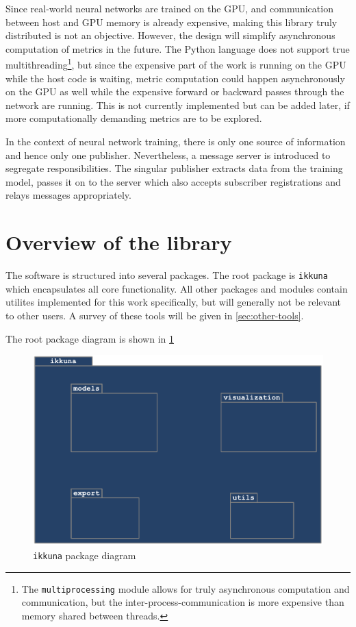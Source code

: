 Since real-world neural networks are trained on the GPU, and
communication between host and GPU memory is already expensive, making this
library truly distributed is not an objective. However, the design will
simplify asynchronous computation of metrics in the future. The Python
language does not support true multithreading\footnote{The
    \texttt{multiprocessing} module allows for truly
    asynchronous computation and communication, but the
    inter-process-communication is more expensive than memory shared
between threads.}, but since the expensive part of the work is running
on the GPU while the host code is waiting, metric computation could
happen asynchronously on the GPU as well while the expensive forward or
backward passes through the network are running. This is not currently
implemented but can be added later, if more computationally demanding
metrics are to be explored.

In the context of neural network training, there is only one source of
information and hence only one publisher. Nevertheless, a message server is
introduced to segregate responsibilities. The singular publisher extracts data from the
training model, passes it on to the server which also accepts subscriber
registrations and relays messages appropriately.

\hypertarget{overview-of-the-library}{%
\section{Overview of the library}\label{overview-of-the-library}}

The software is structured into several packages. The root package is
\texttt{ikkuna} which encapsulates all core
functionality. All other packages and modules contain utilites
implemented for this work specifically, but will generally not be
relevant to other users. A survey of these tools will be given in
\cref{sec:other-tools}.

The root package diagram is shown in \cref{fig:pack-diag-ikkuna}

\begin{figure}
    \hypertarget{fig:pack-diag-ikkuna}{%
        \centering
        \includegraphics[max width=.7\textwidth]{gfx/diagrams/class_diagrams/ikkuna_package_diagram.pdf}
        \caption{\texttt{ikkuna} package diagram}\label{fig:pack-diag-ikkuna}
    }
\end{figure}

